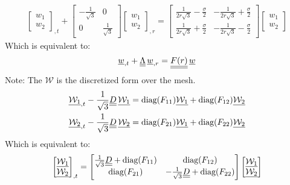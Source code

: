 \begin{align*}
\begin{bmatrix}
w_1 \\
w_2
\end{bmatrix} _{,t}
+ 
\begin{bmatrix}
-\frac{1}{\sqrt{3}} & 0 \\
0 & \frac{1}{\sqrt{3}}
\end{bmatrix}
\begin{bmatrix}
w_1 \\
w_2
\end{bmatrix} _{,r}
=
\begin{bmatrix}
\frac{1}{2r\sqrt{3}} - \frac{\sigma}{2} & -\frac{1}{2r\sqrt{3}} + \frac{\sigma}{2} \\
\frac{1}{2r\sqrt{3}} + \frac{\sigma}{2} & -\frac{1}{2r\sqrt{3}} - \frac{\sigma}{2}
\end{bmatrix}
\begin{bmatrix}
w_1 \\
w_2
\end{bmatrix}
\end{align*}
Which is equivalent to:
\begin{align*}
{\underline{w}}_{,t} + {\underline{\underline{\Lambda}}} \, {\underline{w}}_{,r} = {\underline{\underline{F(r)}}} \, {\underline{w}}
\end{align*}
Note: The $\mathcal{W}$ is the discretized form over the mesh.
\begin{align*}
{\underline{\mathcal{W}_1}}_{,t} - \frac{1}{\sqrt{3}} {\underline{\underline{D}}} \, {\underline{\mathcal{W}_1}} = \text{diag}(F_{11}) {\underline{\mathcal{W}_1}} + \text{diag}(F_{12}){\underline{\mathcal{W}_2}} \\
{\underline{\mathcal{W}_2}}_{,t} - \frac{1}{\sqrt{3}} {\underline{\underline{D}}} \, {\underline{\mathcal{W}_2}} = \text{diag}(F_{21}) {\underline{\mathcal{W}_1}} + \text{diag}(F_{22}){\underline{\mathcal{W}_2}}
\end{align*}
Which is equivalent to:
\begin{align*}
\begin{bmatrix}
{\underline{\mathcal{W}_1}} \\
{\underline{\mathcal{W}_2}}
\end{bmatrix} _{,t}
=
\begin{bmatrix}
\frac{1}{\sqrt{3}} {\underline{\underline{D}}} + \text{diag}(F_{11}) & \text{diag}(F_{12}) \\
\text{diag}(F_{21}) & -\frac{1}{\sqrt{3}} {\underline{\underline{D}}} + \text{diag}(F_{22})
\end{bmatrix}
\begin{bmatrix}
{\underline{\mathcal{W}_1}} \\
{\underline{\mathcal{W}_2}}
\end{bmatrix} 
\end{align*}